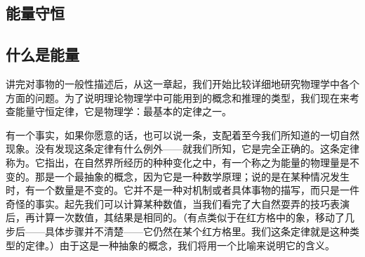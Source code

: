 \documentclass[11pt,oneside]{book}
\begin{document}
\begin{common-format}
\chapter{能量守恒}
\section{什么是能量}
讲完对事物的一般性描述后，从这一章起，我们开始比较详细地研究物理学中各个方面的问题。为了说明理论物理学中可能用到的概念和推理的类型，我们现在来考查能量守恒定律，它是物理学：最基本的定律之一。

有一个事实，如果你愿意的话，也可以说一条，支配着至今我们所知道的一切自然现象。没有发现这条定律有什么例外——就我们所知，它是完全正确的。这条定律称为。它指出，在自然界所经历的种种变化之中，有一个称之为能量的物理量是不变的。那是一个最抽象的概念，因为它是一种数学原理；说的是在某种情况发生时，有一个数量是不变的。它并不是一种对机制或者具体事物的描写，而只是一件奇怪的事实。起先我们可以计算某种数值，当我们看完了大自然耍弄的技巧表演后，再计算一次数值，其结果是相同的。（有点类似于在红方格中的象，移动了几步后——具体步骤并不清楚——它仍然在某个红方格里。我们这条定律就是这种类型的定律。）由于这是一种抽象的概念，我们将用一个比喻来说明它的含义。


\end{common-format}
\end{document}
